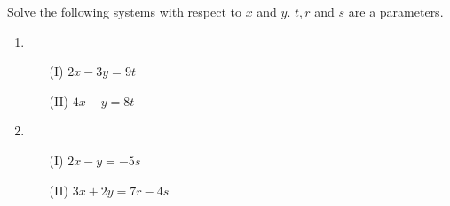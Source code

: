 \begin{comment}
\newpage
\begin{exer}
Write down the following systems in the normal form and solve them afterward:
\begin{enumerate}[label=\emph{\alph*})]
\item  
\begin{itemize}
\item[(I)] $\frac{2x-1}{3}+\frac{y+2}{4}=4$
\item[(II)] $\frac{x+3}{2}-\frac{x-y}{3}=3$
\end{itemize}
\vfill

\item
\begin{itemize}
\item[(I)] $(x+5)(y-2)=(x+2)(y-1)$
\item[(II)] $(x-4)(y+7)=(x-3)(y+4)$
\end{itemize}
\vfill


\item
\begin{itemize}
\item[(I)] $\frac{x+11y}{5}-9\cdot \frac{y+2}{4}=\frac 12$
\item[(II)] $\frac{x}{20}+\frac 56= \frac{x}{15}+\frac{y}{10}$
\end{itemize}
\vfill

\end{enumerate}
\end{exer}
\end{comment}

\newpage
\begin{exer}
Solve the following systems with respect to $x$ and $y$. $t, r$ and $s$ are a parameters.

\begin{enumerate}[label=\emph{\alph*})]

\item
\begin{itemize}
\item[(I)] $2x-3y=9t$
\item[(II)] $4x-y=8t$
\end{itemize}
\vfill

\item
\begin{itemize}
\item[(I)] $2x-y=-5s$
\item[(II)] $3x+2y=7r-4s$
\end{itemize}
\vfill

\end{enumerate}
\end{exer}

